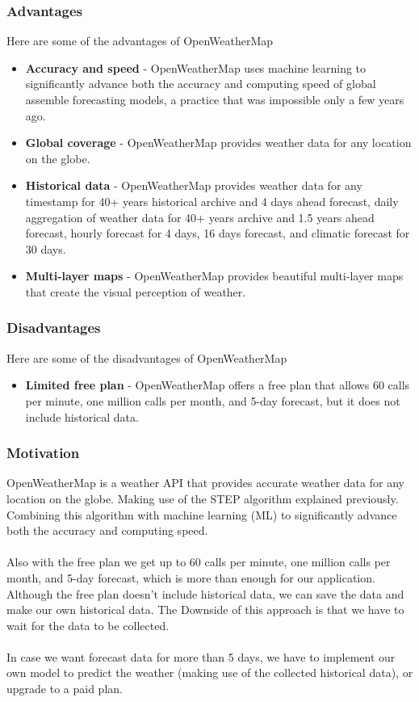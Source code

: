 \documentclass[../paper.tex]{subfiles}
\begin{document}
    \subsubsection{Advantages}
    Here are some of the advantages of OpenWeatherMap
    \begin{itemize}
        \item \textbf{Accuracy and speed} - OpenWeatherMap uses machine learning to significantly advance both the accuracy and computing speed of global assemble forecasting models, a practice that was impossible only a few years ago\cite{b1}.
        \item \textbf{Global coverage} - OpenWeatherMap provides weather data for any location on the globe\cite{b1}.
        \item \textbf{Historical data} - OpenWeatherMap provides weather data for any timestamp for 40+ years historical archive and 4 days ahead forecast, daily aggregation of weather data for 40+ years archive and 1.5 years ahead forecast, hourly forecast for 4 days, 16 days forecast, and climatic forecast for 30 days\cite{b1}.
        \item \textbf{Multi-layer maps} - OpenWeatherMap provides beautiful multi-layer maps that create the visual perception of weather\cite{b1}.
    \end{itemize}

    \subsubsection{Disadvantages}
    Here are some of the disadvantages of OpenWeatherMap
    \begin{itemize}
        \item \textbf{Limited free plan} - OpenWeatherMap offers a free plan that allows 60 calls per minute, one million calls per month, and 5-day forecast, but it does not include historical data\cite{b1}.
    \end{itemize}

    \subsubsection{Motivation}
    OpenWeatherMap is a weather API that provides accurate weather data for any location on the globe.
    Making use of the STEP algorithm explained previously.
    Combining this algorithm with machine learning (ML) to significantly advance both the accuracy and computing speed.
    \\\\
    Also with the free plan we get up to 60 calls per minute, one million calls per month, and 5-day forecast, which is more than enough for our application.
    Although the free plan doesn't include historical data, we can save the data and make our own historical data.
    The Downside of this approach is that we have to wait for the data to be collected.
    \\\\
    In case we want forecast data for more than 5 days, we have to implement our own model to predict the weather (making use of the collected historical data), or upgrade to a paid plan.
\end{document}
